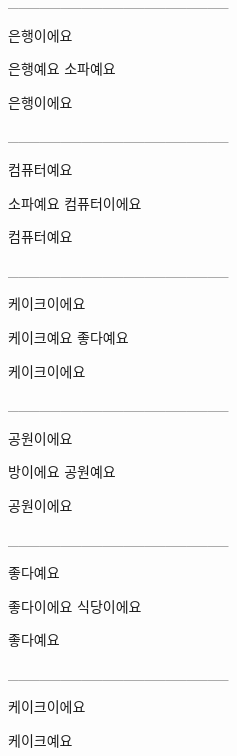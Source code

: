 \documentclass[addpoints, 30pt]{../exam}%
\begin{document}
\begin{questions}
\question[1]%
\_\_\_\_\_\_\_\_\_\_\_\_\_\_\_\_\_\_\_\_\_%
\begin{choices}%
\begin{solution}%
은행이에요%
\end{solution}%
\choice%
은행예요%
\CorrectChoice%
소파예요%
\end{choices}%
\begin{solution}%
은행이에요%
\end{solution}%
\question[1]%
\_\_\_\_\_\_\_\_\_\_\_\_\_\_\_\_\_\_\_\_\_%
\begin{choices}%
\begin{solution}%
컴퓨터예요%
\end{solution}%
\CorrectChoice%
소파예요%
\choice%
컴퓨터이에요%
\end{choices}%
\begin{solution}%
컴퓨터예요%
\end{solution}%
\question[1]%
\_\_\_\_\_\_\_\_\_\_\_\_\_\_\_\_\_\_\_\_\_%
\begin{choices}%
\begin{solution}%
케이크이에요%
\end{solution}%
\choice%
케이크예요%
\CorrectChoice%
좋다예요%
\end{choices}%
\begin{solution}%
케이크이에요%
\end{solution}%
\question[1]%
\_\_\_\_\_\_\_\_\_\_\_\_\_\_\_\_\_\_\_\_\_%
\begin{choices}%
\begin{solution}%
공원이에요%
\end{solution}%
\CorrectChoice%
방이에요%
\choice%
공원예요%
\end{choices}%
\begin{solution}%
공원이에요%
\end{solution}%
\question[1]%
\_\_\_\_\_\_\_\_\_\_\_\_\_\_\_\_\_\_\_\_\_%
\begin{choices}%
\begin{solution}%
좋다예요%
\end{solution}%
\choice%
좋다이에요%
\CorrectChoice%
식당이에요%
\end{choices}%
\begin{solution}%
좋다예요%
\end{solution}%
\question[1]%
\_\_\_\_\_\_\_\_\_\_\_\_\_\_\_\_\_\_\_\_\_%
\begin{choices}%
\begin{solution}%
케이크이에요%
\end{solution}%
\choice%
케이크예요%

\end{choices}
\end{questions}
\end{document}
